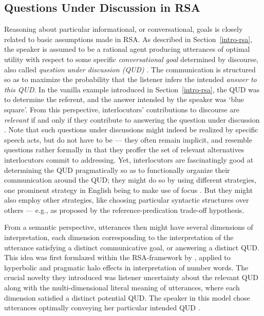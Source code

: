 \subsection{Questions Under Discussion in RSA}
\label{rsa-qud}
Reasoning about particular informational, or conversational, goals is closely related to basic assumptions made in RSA.
As described in Section~\ref{intro-rsa}, the speaker is assumed to be a rational agent producing utterances of optimal utility with respect to some specific \emph{conversational goal} determined by discourse, also called \emph{question under discussion (QUD)}  \parencite{lassiter2017adjectival, roberts2012information}. The communication is structured so as to maximize the probability that the listener infers the intended \emph{answer to this QUD}. In the vanilla example introduced in Section~\ref{intro-rsa}, the QUD was to determine the referent, and the answer intended by the speaker was `blue square'. From this perspective, interlocutors' contributions to discourse are \emph{relevant} if and only if they contribute to answering the question under discussion \parencite{roberts2012information}. Note that such questions under discussions might indeed be realized by specific speech acts, but do not have to be --- they often remain implicit, and resemble questions rather formally in that they proffer the set of relevant alternatives interlocutors commit to addressing. Yet, interlocutors are fascinatingly good at determining the QUD pragmatically so as to functionally organize their communication around the QUD; they might do so by using different strategies, one prominent strategy in English being to make use of focus \parencite{roberts2012information, krifka2008basic}. But they might also employ other strategies, like choosing particular syntactic structures over others --- e.g., as proposed by the reference-predication trade-off hypothesis.  

From a semantic perspective, utterances then might have several dimensions of interpretation, each dimension corresponding to the interpretation of the utterance satisfying a distinct communicative goal, or answering a distinct QUD. This idea was first formlazed within the RSA-framework by \textcite{kao2014nonliteral}, applied to hyperbolic and pragmatic halo effects in interpretation of number words. The crucial novelty they introduced was listener uncertainty about the relevant QUD along with the multi-dimensional literal meaning of utterances, where each dimension satisfied a distinct potential QUD. The speaker in this model chose utterances optimally conveying her particular intended QUD \parencite{kao2014nonliteral}. %

